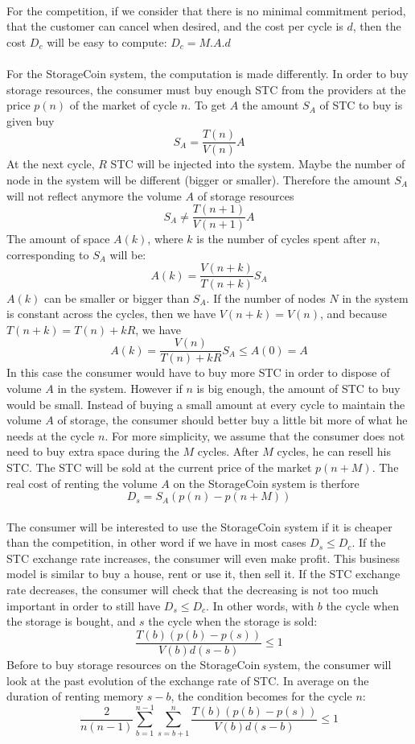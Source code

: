 \documentclass[a4paper,12pt]{article}
\begin{document}
\paragraph*{}
For the competition, if we consider that there is no minimal commitment period, that the customer can cancel when desired, and the cost per cycle is $d$, then the cost $D_{c}$ will be easy to compute: $D_{c}=M.A.d$

\paragraph*{}
For the StorageCoin system, the computation is made differently. In order to buy storage resources, the consumer must buy enough STC from the providers at the price $p(n)$ of the market of cycle $n$.
To get $A$ the amount $S_{A}$ of STC to buy is given buy 
\[S_{A}=\frac{T(n)}{V(n)}A\]
At the next cycle, $R$ STC will be injected into the system. Maybe the number of node in the system will be different (bigger or smaller). 
Therefore the amount $S_{A}$ will not reflect anymore the volume $A$ of storage resources 
\[S_{A}\neq \frac{T(n+1)}{V(n+1)}A\]
The amount of space $A(k)$, where $k$ is the number of cycles spent after $n$, corresponding to $S_{A}$ will be: 
\[A(k)=\frac{V(n+k)}{T(n+k)}S_{A}\]
$A(k)$ can be smaller or bigger than $S_{A}$. If the number of nodes $N$ in the system is constant across the cycles, then we have $V(n+k)=V(n)$, and because $T(n+k)=T(n)+kR$, we have
\[A(k)=\frac{V(n)}{T(n)+kR}S_{A}\le A(0)=A\]
In this case the consumer would have to buy more STC in order to dispose of volume $A$ in the system.
However if $n$ is big enough, the amount of STC to buy would be small.
Instead of buying a small amount at every cycle to maintain the volume $A$ of storage, the consumer should better buy a little bit more of what he needs at the cycle $n$.
For more simplicity, we assume that the consumer does not need to buy extra space during the $M$ cycles.
After $M$ cycles, he can resell his STC. The STC will be sold at the current price of the market $p(n + M)$.
The real cost of renting the volume $A$ on the StorageCoin system is therfore
\[D_{s}=S_{A}(p(n)-p(n+M))\]

\paragraph*{}
The consumer will be interested to use the StorageCoin system if it is cheaper than the competition, in other word if we have in most cases $D_{s}\le D_{c}$.
If the STC exchange rate increases, the consumer will even make profit. 
This business model is similar to buy a house, rent or use it, then sell it.
If the STC exchange rate decreases, the consumer will check that the decreasing is not too much important in order to still have 
$D_{s}\le D_{c}$. In other words, with $b$ the cycle when the storage is bought, and $s$ the cycle when the storage is sold:
\[\frac{T(b)(p(b)-p(s))}{V(b)d(s-b)}\le 1\]
Before to buy storage resources on the StorageCoin system, the consumer will look at the past evolution of the exchange rate of STC.
In average on the duration of renting memory $s-b$, the condition becomes for the cycle $n$:
\[\frac{2}{n(n-1)}\sum\limits_{b=1}^{n-1} \sum\limits_{s=b+1}^{n}\frac{T(b)(p(b)-p(s))}{V(b)d(s-b)}\le 1\]


\end{document}
